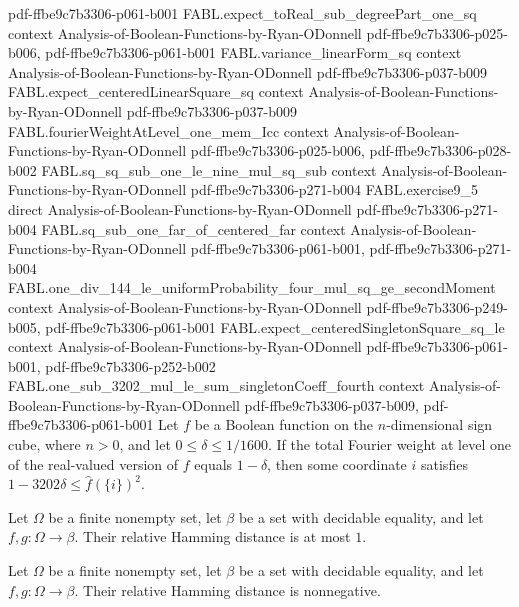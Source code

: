 \begin{theorem}
{    pdf-ffbe9c7b3306-p061-b001}
\proofstep
  {FABL.expect_toReal_sub_degreePart_one_sq}
  {context}
  {Analysis-of-Boolean-Functions-by-Ryan-ODonnell}
  {pdf-ffbe9c7b3306-p025-b006,
    pdf-ffbe9c7b3306-p061-b001}
\proofstep
  {FABL.variance_linearForm_sq}
  {context}
  {Analysis-of-Boolean-Functions-by-Ryan-ODonnell}
  {pdf-ffbe9c7b3306-p037-b009}
\proofstep
  {FABL.expect_centeredLinearSquare_sq}
  {context}
  {Analysis-of-Boolean-Functions-by-Ryan-ODonnell}
  {pdf-ffbe9c7b3306-p037-b009}
\proofstep
  {FABL.fourierWeightAtLevel_one_mem_Icc}
  {context}
  {Analysis-of-Boolean-Functions-by-Ryan-ODonnell}
  {pdf-ffbe9c7b3306-p025-b006,
    pdf-ffbe9c7b3306-p028-b002}
\proofstep
  {FABL.sq_sq_sub_one_le_nine_mul_sq_sub}
  {context}
  {Analysis-of-Boolean-Functions-by-Ryan-ODonnell}
  {pdf-ffbe9c7b3306-p271-b004}
\proofstep
  {FABL.exercise9_5}
  {direct}
  {Analysis-of-Boolean-Functions-by-Ryan-ODonnell}
  {pdf-ffbe9c7b3306-p271-b004}
\proofstep
  {FABL.sq_sub_one_far_of_centered_far}
  {context}
  {Analysis-of-Boolean-Functions-by-Ryan-ODonnell}
  {pdf-ffbe9c7b3306-p061-b001,
    pdf-ffbe9c7b3306-p271-b004}
\proofstep
  {FABL.one_div_144_le_uniformProbability_four_mul_sq_ge_secondMoment}
  {context}
  {Analysis-of-Boolean-Functions-by-Ryan-ODonnell}
  {pdf-ffbe9c7b3306-p249-b005,
    pdf-ffbe9c7b3306-p061-b001}
\proofstep
  {FABL.expect_centeredSingletonSquare_sq_le}
  {context}
  {Analysis-of-Boolean-Functions-by-Ryan-ODonnell}
  {pdf-ffbe9c7b3306-p061-b001,
    pdf-ffbe9c7b3306-p252-b002}
\proofstep
  {FABL.one_sub_3202_mul_le_sum_singletonCoeff_fourth}
  {context}
  {Analysis-of-Boolean-Functions-by-Ryan-ODonnell}
  {pdf-ffbe9c7b3306-p037-b009,
    pdf-ffbe9c7b3306-p061-b001}
Let $f$ be a Boolean function on the $n$-dimensional sign cube, where $n>0$, and let
$0\le\delta\le 1/1600$. If the total Fourier weight at level one of the real-valued
version of $f$ equals $1-\delta$, then some coordinate $i$ satisfies $1-3202\delta\le
\widehat f(\{i\})^2$.
\end{theorem}

\begin{theorem}
\label{FABL.relativeHammingDist_le_one}
\leanok
{}
Let $\Omega$ be a finite nonempty set, let $\beta$ be a set with decidable equality,
and let $f,g:\Omega\to\beta$. Their relative Hamming distance is at most $1$.
\end{theorem}

\begin{theorem}
\label{FABL.relativeHammingDist_nonneg}
\leanok
{}
Let $\Omega$ be a finite nonempty set, let $\beta$ be a set with decidable equality,
and let $f,g:\Omega\to\beta$. Their relative Hamming distance is nonnegative.
\end{theorem}

